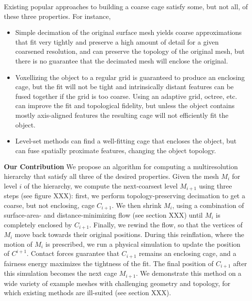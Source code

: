 Existing popular approaches to building a coarse cage satisfy some, but not
all, of these three properties. For instance,
\begin{itemize}
\item Simple decimation of the original surface mesh yields coarse approximations that fit very
tightly and preserve a high amount of detail for a given coarsened resolution,
and can preserve the topology of the original mesh, but there is no guarantee
that the decimated mesh will enclose the original.
\item Voxellizing the object to a regular grid is guaranteed to produce an
enclosing cage, but the fit will not be tight and intrinsically distant
features can be fused together if the grid is too coarse. Using an adaptive
grid, octree, etc. can improve the fit and topological fidelity, but unless the
object contains mostly axis-aligned features the resulting cage will not
efficiently fit the object.
\item Level-set methods can find a well-fitting cage that encloses the object,
but can fuse spatially proximate features, changing the object topology.
\end{itemize}

\noindent\textbf{Our Contribution} We propose an algorithm for computing a
multiresolution hierarchy that satisfy all three of the desired properties. Given the
mesh $M_i$ for level $i$ of the hierarchy, we compute the next-coarsest level
$M_{i+1}$ using three steps (see figure XXX): first, we perform
topology-preserving decimation to get a coarse, but not enclosing, cage
$C_{i+1}$. We then shrink $M_i$, using a combination of surface-area- and
distance-minimizing flow (see section XXX) until $M_i$ is completely enclosed
by $C_{i+1}$. Finally, we rewind the flow, so that the vertices of $M_i$ move back towards
their original positions. During this reinflation, where the motion of $M_i$ is prescribed, we run a physical simulation to update the position of $C^{i+1}$. Contact forces
guarantee that $C_{i+1}$ remains an enclosing cage, and a fairness energy
maximizes the tightness of the fit. The final position of $C_{i+1}$ after this
simulation becomes the next cage $M_{i+1}$. We demonstrate this method on a wide variety of example meshes with challenging geometry and topology, for which existing methods are ill-suited (see section XXX). 
